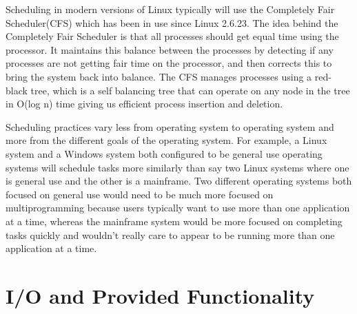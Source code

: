 \documentclass[10pt,serif,draftclsnofoot,onecolumn]{IEEEtran}
\begin{document}
	\newline
	\par
	Scheduling in modern versions of Linux typically will use the Completely Fair Scheduler(CFS) which has been in use since Linux 2.6.23\cite{6}. The idea behind the Completely Fair Scheduler is that all processes should get equal time using the processor. It maintains this balance between the processes by detecting if any processes are not getting fair time on the processor, and then corrects this to bring the system back into balance. The CFS manages processes using a red-black tree, which is a self balancing tree that can operate on any node in the tree in O(log n) time giving us efficient process insertion and deletion\cite{6}.
	\newline
	\par
	Scheduling practices vary less from operating system to operating system and more from the different goals of the operating system. For example, a Linux system and a Windows system both configured to be general use operating systems will schedule tasks more similarly than say two Linux systems where one is general use and the other is a mainframe. Two different operating systems both focused on general use would need to be much more focused on multiprogramming because users typically want to use more than one application at a time, whereas the mainframe system would be more focused on completing tasks quickly and wouldn't really care to appear to be running more than one application at a time.
	
\section{I/O and Provided Functionality}
\end{document}
